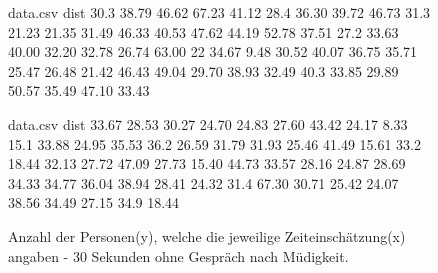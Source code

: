 \documentclass{Paper}
\begin{document}
\begin{figure}[H]
\begin{filecontents}{data.csv}
dist
   30.3
   38.79
 46.62
 67.23
 41.12
 28.4
 36.30
 39.72
 46.73
 31.3
 21.23
 21.35
 31.49
 46.33
 40.53
 47.62
 44.19
 52.78
 37.51
 27.2
 33.63
 40.00
 32.20
 32.78
 26.74
 63.00
 22
 34.67
 9.48
 30.52
 40.07
 36.75
 35.71
 25.47
 26.48
 21.42
 46.43
 49.04
 29.70
 38.93
 32.49
 40.3
 33.85
 29.89
 50.57
 35.49
 47.10
 33.43
\end{filecontents}
\begin{minipage}[t]{0.49\linewidth}
\caption{Anzahl der Personen(y), welche die jeweilige Zeiteinschätzung(x) angaben - 40 Sekunden ohne Gespräch nach Müdigkeit.}
\label{HistZeit40sekMued}
\end{minipage}
\hfill
\begin{filecontents}{data.csv}
dist
  33.67
 28.53
 30.27
 24.70
 24.83
 27.60
 43.42
 24.17
 8.33
 15.1
 33.88
 24.95
 35.53
 36.2
 26.59
 31.79
 31.93
 25.46
 41.49
 15.61
 33.2
 18.44
 32.13
 27.72
 47.09
 27.73
 15.40
 44.73
 33.57
 28.16 
 24.87
 28.69
 34.33
 34.77
 36.04
 38.94
 28.41
 24.32
 31.4
 67.30
 30.71
 25.42
 24.07
 38.56
 34.49
 27.15 
 34.9
18.44
\end{filecontents}
\begin{minipage}[t]{0.49\linewidth}
\caption{Anzahl der Personen(y), welche die jeweilige Zeiteinschätzung(x) angaben - 30 Sekunden ohne Gespräch nach Müdigkeit.}
\label{HistZeit30sekMued}
\end{minipage}
\end{figure}

\end{document}

